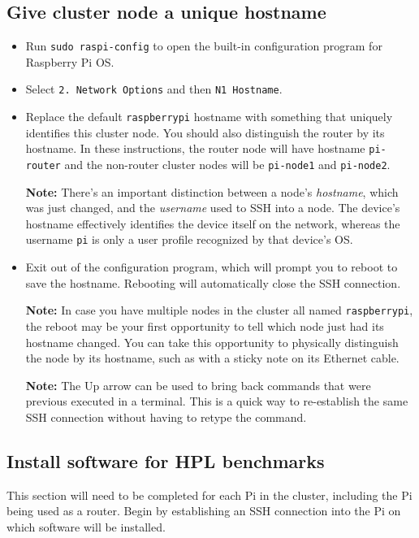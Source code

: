 \documentclass{article}
\begin{document}
\subsection{Give cluster node a unique hostname}
\begin{itemize}
    \item Run \texttt{sudo raspi-config} to open the built-in configuration program for Raspberry Pi OS.
    
    \item Select \texttt{2. Network Options} and then \texttt{N1 Hostname}.
    
    \item Replace the default \texttt{raspberrypi} hostname with something that uniquely identifies this cluster node. You should also distinguish the router by its hostname. In these instructions, the router node will have hostname \texttt{pi-router} and the non-router cluster nodes will be \texttt{pi-node1} and \texttt{pi-node2}.
    
    \textbf{Note:} There's an important distinction between a node's \emph{hostname}, which was just changed, and the \emph{username} used to SSH into a node. The device's hostname effectively identifies the device itself on the network, whereas the username \texttt{pi} is only a user profile recognized by that device's OS.  
    
    \item Exit out of the configuration program, which will prompt you to reboot to save the hostname. Rebooting will automatically close the SSH connection.  
    
    \textbf{Note:} In case you have multiple nodes in the cluster all named \texttt{raspberrypi}, the reboot may be your first opportunity to tell which node just had its hostname changed. You can take this opportunity to physically distinguish the node by its hostname, such as with a sticky note on its Ethernet cable.
    
    \textbf{Note:} The Up arrow can be used to bring back commands that were previous executed in a terminal. This is a quick way to re-establish the same SSH connection without having to retype the command.
\end{itemize}

\subsection{Install software for HPL benchmarks}

This section will need to be completed for each Pi in the cluster, including the Pi being used as a router. Begin by establishing an SSH connection into the Pi on which software will be installed.
\end{document}
